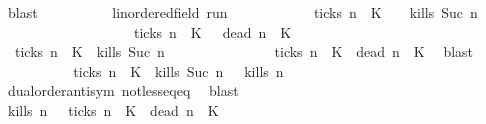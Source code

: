 \begin{isabellebody}
\ blast\isanewline
\ \ \isamarkupfalse%
\isanewline
\ \ \ \ \isacommand{{\isacharbraceleft}}\isamarkupfalse%
\ \isamarkupfalse%
\ {\isasymrho}{\isacharcolon}{\isacharcolon}{\isacartoucheopen}{\isacharprime}{\isasymtau}{\isacharcolon}{\isacharcolon}linordered{\isacharunderscore}field\ run{\isacartoucheclose}\isanewline
\ \ \ \ \ \ \isamarkupfalse%
\ {\isacartoucheopen}{\isasymrho}\ {\isasymin}\ {\isacharparenleft}{\isacharbraceleft}{\isasymrho}{\isachardot}\ {\isasymnot}\ {\isacharquery}ticks\ n\ {\isasymrho}\ K\ \ {\isasyminter}\ {\isacharbraceleft}{\isasymrho}{\isachardot}\ {\isacharquery}kills\ {\isacharparenleft}Suc\ n{\isacharparenright}\ {\isasymrho}{\isacharbraceright}{\isacharparenright}\isanewline
\ \ \ \ \ \ \ \ \ \ \ \ \ \ \ \ \ {\isasymunion}\ {\isacharparenleft}{\isacharbraceleft}{\isasymrho}{\isachardot}\ {\isacharquery}ticks\ n\ {\isasymrho}\ K\ {\isasyminter}\ {\isacharbraceleft}{\isasymrho}{\isachardot}\ {\isacharquery}dead\ n\ {\isasymrho}\ K\isanewline
\ \ \ \ \ \ \isamarkupfalse%
\ {\isacartoucheopen}{\isasymnot}\ {\isacharquery}ticks\ n\ {\isasymrho}\ K\ {\isasymand}\ {\isacharquery}kills\ {\isacharparenleft}Suc\ n{\isacharparenright}\ {\isasymrho}\isanewline
\ \ \ \ \ \ \ \ \ \ \ \ \ {\isasymor}\ {\isacharquery}ticks\ n\ {\isasymrho}\ K\ {\isasymand}\ {\isacharquery}dead\ n\ {\isasymrho}\ K\ \isamarkupfalse%
\ blast\isanewline
\ \ \ \ \ \ \isamarkupfalse%
\ \isamarkupfalse%
\ {\isacartoucheopen}{\isacharparenleft}{\isacharparenleft}{\isasymnot}\ {\isacharquery}ticks\ n\ {\isasymrho}\ K\ {\isasymand}\ {\isacharparenleft}{\isacharquery}kills\ {\isacharparenleft}Suc\ n{\isacharparenright}\ {\isasymrho}{\isacharparenright}{\isacharparenright}\ {\isasymlongrightarrow}\ {\isacharquery}kills\ n\ {\isasymrho}{\isacartoucheclose}\isanewline
\ \ \ \ \ \ \ \ \isamarkupfalse%
\ dual{\isacharunderscore}order{\isachardot}antisym\ not{\isacharunderscore}less{\isacharunderscore}eq{\isacharunderscore}eq\ \isamarkupfalse%
\ blast\isanewline
\ \ \ \ \ \ \isamarkupfalse%
\ \isamarkupfalse%
\ {\isacartoucheopen}{\isacharquery}kills\ n\ {\isasymrho}\ {\isasymor}\ {\isacharquery}ticks\ n\ {\isasymrho}\ K\ {\isasymand}\ {\isacharquery}dead\ n\ {\isasymrho}\ K\ \isamarkupfalse%

\end{isabellebody}
